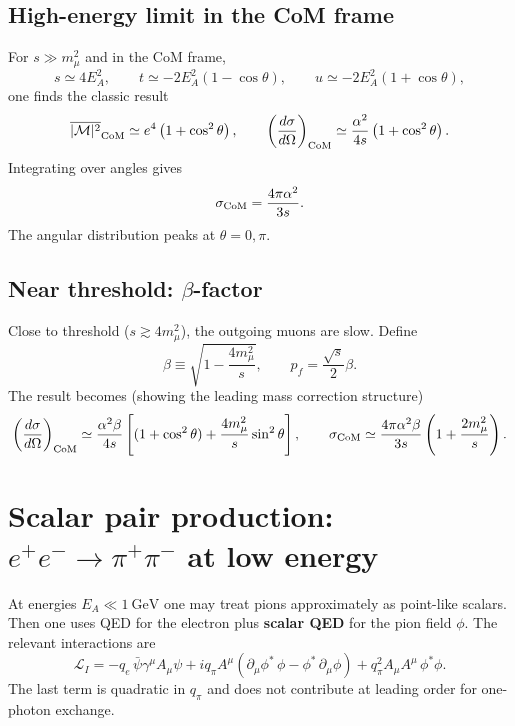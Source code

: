 \subsection{High-energy limit in the CoM frame}
For $s\gg m_\mu^2$ and in the CoM frame,
\begin{equation}
s\simeq 4E_A^2,
\qquad
t\simeq -2E_A^2(1-\cos\theta),
\qquad
u\simeq -2E_A^2(1+\cos\theta),
\end{equation}
one finds the classic result
\begin{equation}
\overline{|\mathcal{M}|^2}_{\rm CoM}
\simeq
e^4\left(1+\cos^2\theta\right),
\qquad
\left(\frac{d\sigma}{d\Omega}\right)_{\rm CoM}
\simeq
\frac{\alpha^2}{4s}\left(1+\cos^2\theta\right).
\end{equation}
Integrating over angles gives
\begin{equation}
\sigma_{\rm CoM}
=
\frac{4\pi\alpha^2}{3s}.
\end{equation}
The angular distribution peaks at $\theta=0,\pi$.

\subsection{Near threshold: $\beta$-factor}
Close to threshold ($s\gtrsim 4m_\mu^2$), the outgoing muons are slow. Define
\begin{equation}
\beta \equiv \sqrt{1-\frac{4m_\mu^2}{s}},
\qquad
p_f = \frac{\sqrt{s}}{2}\beta.
\end{equation}
The result becomes (showing the leading mass correction structure)
\begin{equation}
\left(\frac{d\sigma}{d\Omega}\right)_{\rm CoM}
\simeq
\frac{\alpha^2\beta}{4s}\left[(1+\cos^2\theta)+\frac{4m_\mu^2}{s}\sin^2\theta\right],
\qquad
\sigma_{\rm CoM}
\simeq
\frac{4\pi\alpha^2\beta}{3s}\left(1+\frac{2m_\mu^2}{s}\right).
\end{equation}

\section{Scalar pair production: $e^+e^- \to \pi^+\pi^-$ at low energy}
At energies $E_A\ll 1~\text{GeV}$ one may treat pions approximately as point-like scalars.
Then one uses QED for the electron plus \textbf{scalar QED} for the pion field $\phi$.
The relevant interactions are
\begin{equation}
\mathcal{L}_I
=
-q_e\,\bar\psi\gamma^\mu A_\mu\psi
+ i q_\pi A^\mu\left(\partial_\mu\phi^\ast\,\phi-\phi^\ast\,\partial_\mu\phi\right)
+ q_\pi^2 A_\mu A^\mu\,\phi^\ast\phi.
\end{equation}
The last term is quadratic in $q_\pi$ and does not contribute at leading order for one-photon exchange.

